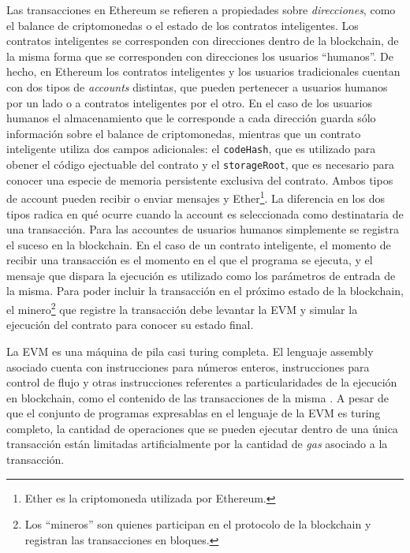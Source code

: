 Las transacciones en Ethereum se refieren a propiedades sobre \textit{direcciones}, como el balance de criptomonedas o el estado de los contratos inteligentes.
Los contratos inteligentes se corresponden con direcciones dentro de la blockchain, de la misma forma que se corresponden con direcciones los usuarios ``humanos''.
De hecho, en Ethereum los contratos inteligentes y los usuarios tradicionales cuentan con dos tipos de \textit{accounts} distintas, que pueden pertenecer a usuarios humanos por un lado o a contratos inteligentes por el otro.
En el caso de los usuarios humanos el almacenamiento que le corresponde a cada dirección guarda sólo información sobre el balance de criptomonedas, mientras que un contrato inteligente utiliza dos campos adicionales: el \texttt{codeHash}, que es utilizado para obener el código ejectuable del contrato y el \texttt{storageRoot}, que es necesario para conocer una especie de memoria persistente exclusiva del contrato.
Ambos tipos de account pueden recibir o enviar mensajes y Ether\footnote{Ether es la criptomoneda utilizada por Ethereum.}.
La diferencia en los dos tipos radica en qué ocurre cuando la account es seleccionada como destinataria de una transacción.
Para las accountes de usuarios humanos simplemente se registra el suceso en la blockchain.
En el caso de un contrato inteligente, el momento de recibir una transacción es el momento en el que el programa se ejecuta, y el mensaje que dispara la ejecución es utilizado como los parámetros de entrada de la misma.
Para poder incluir la transacción en el próximo estado de la blockchain, el minero\footnote{Los ``mineros'' son quienes participan en el protocolo de la blockchain y registran las transacciones en bloques.} que registre la transacción debe levantar la EVM y simular la ejecución del contrato para conocer su estado final.

La EVM es una máquina de pila casi turing completa.
El lenguaje assembly asociado cuenta con instrucciones para números enteros, instrucciones para control de flujo y otras instrucciones referentes a particularidades de la ejecución en blockchain, como el contenido de las transacciones de la misma \cite{evm-opcodes}.
A pesar de que el conjunto de programas expresablas en el lenguaje de la EVM es turing completo, la cantidad de operaciones que se pueden ejecutar dentro de una única transacción están limitadas artificialmente por la cantidad de \textit{gas} asociado a la transacción.

